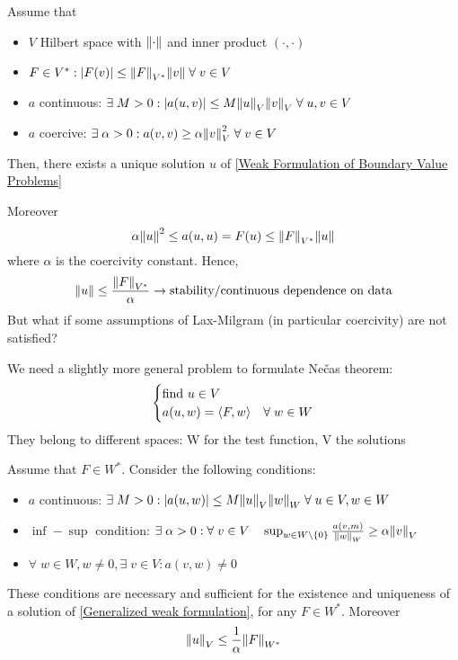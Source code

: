 \begin{theorem}
    Assume that 
    \begin{itemize}
        \item \(V\) Hilbert space with \(\norm{\cdot}\) and inner product \((\cdot, \cdot)\)
        \item \(F \in V^*: \abs{F(v)} \leq \norm{F}_{V^*}\norm{v} \; \forall \; v \in V\)
        \item \(a\) continuous: \(\exists \; M > 0: \abs{a(u,v)} \leq M \norm{u}_V\norm{v}_V \; \forall \; u,v \in V\)
        \item \(a\) coercive: \(\exists \; \alpha > 0: a(v,v) \geq \alpha\norm{v}_V^2 \; \forall \; v \in V\)
    \end{itemize}
    Then, there exists a unique solution \(u\) of \ref*{Weak Formulation of Boundary Value Problems}
\end{theorem}
Moreover 
\[
    \alpha \norm{u}^2 \leq a(u,u) = F(u) \leq \norm{F}_{V^*} \norm{u}
\]
where \(\alpha\) is the coercivity constant. Hence,
\[
    \norm{u} \leq \frac{\norm{F}_{V^*}}{\alpha} \to \text{stability/continuous dependence on data}
\]
But what if some assumptions of Lax-Milgram (in particular coercivity) are not satisfied?

We need a slightly more general problem to formulate Nečas theorem:
\begin{equation}
    \begin{cases}
        \text{find } u \in V \\
        a(u,w) = \langle F,w \rangle & \forall \; w \in W \label{Generalized weak formulation}
    \end{cases}
\end{equation}
They belong to different spaces: W for the test function, V the solutions
\begin{theorem}[Nečas]
    Assume that \(F \in W^*\). Consider the following conditions:
    \begin{itemize}
        \item \(a\) continuous: \(\exists \; M > 0: \abs{a(u,w)} \leq M \norm{u}_V \norm{w}_W \; \forall \; u \in V, w \in W\)
        \item \(\inf-\sup\) condition: \(\exists \; \alpha > 0: \forall \; v \in V \quad \sup_{w \in W \setminus \left\{0\right\}} \frac{a(v,m)}{\norm{w}_W} \geq \alpha \norm{v}_V\)
        \item \(\forall \; w \in W, w \neq 0, \exists \; v \in V : a(v,w) \neq 0\)
    \end{itemize}
    These conditions are necessary and sufficient for the existence and uniqueness of a solution of \ref*{Generalized weak formulation}, for any \(F \in W^*\). Moreover 
    \[
        \norm{u}_V \leq \frac{1}{\alpha}\norm{F}_{W^*}
    \]
\label{Nečas}
\end{theorem}

